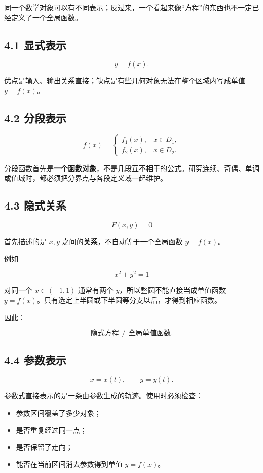 \documentclass[11pt,a4paper]{ctexart}
\providecommand{\tightlist}{}
\begin{document}
同一个数学对象可以有不同表示；反过来，一个看起来像``方程''的东西也不一定已经定义了一个全局函数。

\subsection{4.1 显式表示}\label{ux663eux5f0fux8868ux793a}

\[
y=f(x).
\]

优点是输入、输出关系直接；缺点是有些几何对象无法在整个区域内写成单值
\(y=f(x)\)。

\subsection{4.2 分段表示}\label{ux5206ux6bb5ux8868ux793a}

\[
f(x)=
\begin{cases}
f_1(x),&x\in D_1,\\
f_2(x),&x\in D_2.
\end{cases}
\]

分段函数首先是\textbf{一个函数对象}，不是几段互不相干的公式。研究连续、奇偶、单调或值域时，都必须把分界点与各段定义域一起维护。

\subsection{4.3 隐式关系}\label{ux9690ux5f0fux5173ux7cfb}

\[
F(x,y)=0
\]

首先描述的是 \(x,y\) 之间的\textbf{关系}，不自动等于一个全局函数
\(y=f(x)\)。

例如

\[
x^2+y^2=1
\]

对同一个 \(x\in(-1,1)\) 通常有两个 \(y\)，所以整圆不能直接当成单值函数
\(y=f(x)\)。只有选定上半圆或下半圆等分支以后，才得到相应函数。

因此：

\[
\boxed{\text{隐式方程}\neq\text{全局单值函数}.}
\]

\subsection{4.4 参数表示}\label{ux53c2ux6570ux8868ux793a}

\[
x=x(t),\qquad y=y(t).
\]

参数式直接表示的是一条由参数生成的轨迹。使用时必须检查：

\begin{itemize}
\tightlist
\item
  参数区间覆盖了多少对象；
\item
  是否重复经过同一点；
\item
  是否保留了走向；
\item
  能否在当前区间消去参数得到单值 \(y=f(x)\)。
\end{itemize}
\end{document}
